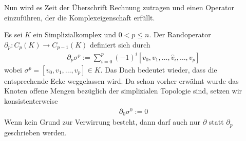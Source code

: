   Nun wird es Zeit der Überschrift Rechnung zutragen und einen Operator einzuführen, der die Komplexeigenschaft erfüllt. 
  
  \begin{definition}
    \label{defRandoperator}
    Es sei \( K \) ein Simplizialkomplex und \( 0 < p \le n \).
    Der Randoperator \( \partial_{p}: C_{p}(K) \rightarrow C_{p-1}(K) \) definiert sich durch
    \begin{align}
      \partial_{p}\sigma^{p} := \sum_{i=0}^{p} (-1)^{i} \left[ v_{0}, v_{1}, \ldots, \hat{v}_{i}, \ldots, v_{p} \right]
    \end{align}
    wobei \( \sigma^{p} = \left[ v_{0}, v_{1}, \ldots, v_{p} \right] \in K\). 
    Das Dach bedeutet wieder, dass die entsprechende Ecke weggelassen wird.
    Da schon vorher erwähnt wurde das Knoten offene Mengen bezüglich der simplizialen Topologie sind, setzen wir konsistenterweise
    \begin{align}
      \partial_{0}\sigma^{0} := 0
    \end{align}
    Wenn kein Grund zur Verwirrung besteht, dann darf auch nur \( \partial \) statt \( \partial_{p} \) geschrieben werden.
  \end{definition}

  \begin{figure}
  \end{figure}

